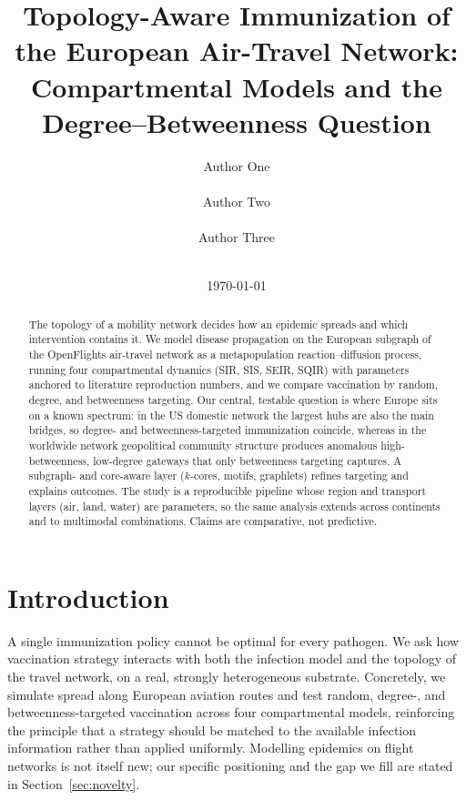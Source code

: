 \documentclass{sigkddExp}
\begin{document}
\title{Topology-Aware Immunization of the European Air-Travel Network:
Compartmental Models and the Degree--Betweenness Question}

\author{
\alignauthor Author One\\
       \\
\alignauthor Author Two\\
       \\
\alignauthor Author Three\\
       \\
}
\date{\today}
\maketitle

\begin{abstract}
The topology of a mobility network decides how an epidemic spreads and
which intervention contains it. We model disease propagation on the
European subgraph of the OpenFlights air-travel network as a
metapopulation reaction--diffusion process, running four compartmental
dynamics (SIR, SIS, SEIR, SQIR) with parameters anchored to literature
reproduction numbers, and we compare vaccination by random, degree, and
betweenness targeting. Our central, testable question is where Europe sits
on a known spectrum: in the US domestic network the largest hubs are also
the main bridges, so degree- and betweenness-targeted immunization
coincide, whereas in the worldwide network geopolitical community
structure produces anomalous high-betweenness, low-degree gateways that
only betweenness targeting captures. A subgraph- and core-aware layer
($k$-cores, motifs, graphlets) refines targeting and explains outcomes.
The study is a reproducible pipeline whose region and transport layers
(air, land, water) are parameters, so the same analysis extends across
continents and to multimodal combinations. Claims are comparative, not
predictive.
\end{abstract}

\section{Introduction}
A single immunization policy cannot be optimal for every pathogen. We ask
how vaccination strategy interacts with both the infection model and the
topology of the travel network, on a real, strongly heterogeneous
substrate. Concretely, we simulate spread along European aviation routes
and test random, degree-, and betweenness-targeted vaccination across four
compartmental models, reinforcing the principle that a strategy should be
matched to the available infection information rather than applied
uniformly. Modelling epidemics on flight networks is not itself new; our
specific positioning and the gap we fill are stated in
Section~\ref{sec:novelty}.
\end{document}
